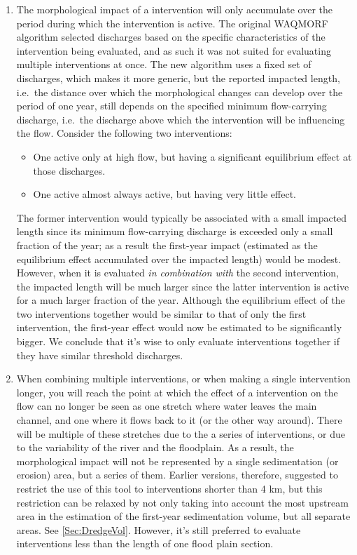 \begin{enumerate}
\item The morphological impact of a intervention will only accumulate over the period during which the intervention is active.
The original WAQMORF algorithm selected discharges based on the specific characteristics of the intervention being evaluated, and as such it was not suited for evaluating multiple interventions at once.
The new algorithm uses a fixed set of discharges, which makes it more generic, but the reported impacted length, i.e.~the distance over which the morphological changes can develop over the period of one year, still depends on the specified minimum flow-carrying discharge, i.e.~the discharge above which the intervention will be influencing the flow.
Consider the following two interventions:
\begin{itemize}
\item One active only at high flow, but having a significant equilibrium effect at those discharges.
\item One active almost always active, but having very little effect.
\end{itemize}
The former intervention would typically be associated with a small impacted length since its minimum flow-carrying discharge is exceeded only a small fraction of the year; as a result the first-year impact (estimated as the equilibrium effect accumulated over the impacted length) would be modest.
However, when it is evaluated \emph{in combination with} the second intervention, the impacted length will be much larger since the latter intervention is active for a much larger fraction of the year.
Although the equilibrium effect of the two interventions together would be similar to that of only the first intervention, the first-year effect would now be estimated to be significantly bigger.
We conclude that it's wise to only evaluate interventions together if they have similar threshold discharges.

\item When combining multiple interventions, or when making a single intervention longer, you will reach the point at which the effect of a intervention on the flow can no longer be seen as one stretch where water leaves the main channel, and one where it flows back to it (or the other way around).
There will be multiple of these stretches due to the a series of interventions, or due to the variability of the river and the floodplain.
As a result, the morphological impact will not be represented by a single sedimentation (or erosion) area, but a series of them.
Earlier versions, therefore, suggested to restrict the use of this tool to interventions shorter than 4 km, but this restriction can be relaxed by not only taking into account the most upstream area in the estimation of the first-year sedimentation volume, but all separate areas.
See \autoref{Sec:DredgeVol}.
However, it's still preferred to evaluate interventions less than the length of one flood plain section.


\end{enumerate}
